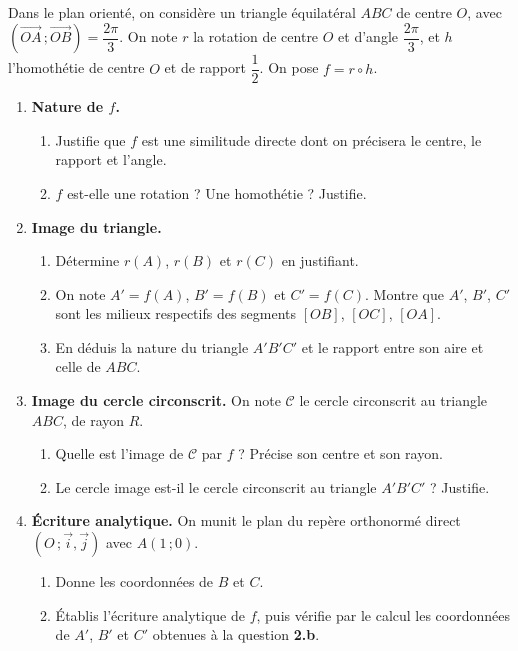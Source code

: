 \documentclass[11pt]{article}
\begin{document}
\begin{exercice}
Dans le plan orienté, on considère un triangle équilatéral $ABC$ de centre $O$, avec $\left(\overrightarrow{OA}\,;\overrightarrow{OB}\right) = \dfrac{2\pi}{3}$. On note $r$ la rotation de centre $O$ et d'angle $\dfrac{2\pi}{3}$, et $h$ l'homothétie de centre $O$ et de rapport $\dfrac{1}{2}$. On pose $f = r \circ h$.
\begin{enumerate}
\item \textbf{Nature de $f$.}
\begin{enumerate}
\item Justifie que $f$ est une similitude directe dont on précisera le centre, le rapport et l'angle.
\item $f$ est-elle une rotation ? Une homothétie ? Justifie.
\end{enumerate}
\item \textbf{Image du triangle.}
\begin{enumerate}
\item Détermine $r(A)$, $r(B)$ et $r(C)$ en justifiant.
\item On note $A' = f(A)$, $B' = f(B)$ et $C' = f(C)$. Montre que $A'$, $B'$, $C'$ sont les milieux respectifs des segments $[OB]$, $[OC]$, $[OA]$.
\item En déduis la nature du triangle $A'B'C'$ et le rapport entre son aire et celle de $ABC$.
\end{enumerate}
\item \textbf{Image du cercle circonscrit.} On note $\mathcal{C}$ le cercle circonscrit au triangle $ABC$, de rayon $R$.
\begin{enumerate}
\item Quelle est l'image de $\mathcal{C}$ par $f$ ? Précise son centre et son rayon.
\item Le cercle image est-il le cercle circonscrit au triangle $A'B'C'$ ? Justifie.
\end{enumerate}
\item \textbf{Écriture analytique.} On munit le plan du repère orthonormé direct $(O\,;\vec{i},\vec{j})$ avec $A(1\,;0)$.
\begin{enumerate}
\item Donne les coordonnées de $B$ et $C$.
\item Établis l'écriture analytique de $f$, puis vérifie par le calcul les coordonnées de $A'$, $B'$ et $C'$ obtenues à la question \textbf{2.b}.
\end{enumerate}
\end{enumerate}
\end{exercice}
\end{document}
